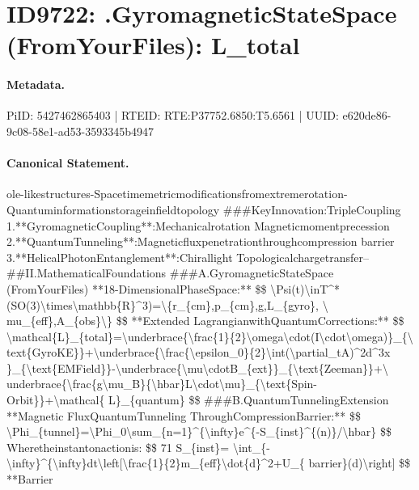\section*{ID9722: .GyromagneticStateSpace (FromYourFiles): L\_total}
\paragraph{Metadata.}
PiID: 5427462865403 | RTEID: RTE:P37752.6850:T5.6561 | UUID: e620de86-9c08-58e1-ad53-3593345b4947

\paragraph{Canonical Statement.}
ole-likestructures-Spacetimemetricmodificationsfromextremerotation-Quantuminformationstorageinfieldtopology \#\#\#KeyInnovation:TripleCoupling 1.**GyromagneticCoupling**:Mechanicalrotation Magneticmomentprecession 2.**QuantumTunneling**:Magneticfluxpenetrationthroughcompression barrier 3.**HelicalPhotonEntanglement**:Chirallight Topologicalchargetransfer-- \#\#II.MathematicalFoundations \#\#\#A.GyromagneticStateSpace (FromYourFiles) **18-DimensionalPhaseSpace:** \$\$ \textbackslash{}Psi(t)\textbackslash{}inT\textasciicircum{}*(SO(3)\textbackslash{}times\textbackslash{}mathbb\{R\}\textasciicircum{}3)=\textbackslash{}\{r\_\{cm\},p\_\{cm\},g,L\_\{gyro\}, \textbackslash{} mu\_\{eff\},A\_\{obs\}\textbackslash{}\} \$\$ **Extended LagrangianwithQuantumCorrections:** \$\$ \textbackslash{}mathcal\{L\}\_\{total\}=\textbackslash{}underbrace\{\textbackslash{}frac\{1\}\{2\}\textbackslash{}omega\textbackslash{}cdot(I\textbackslash{}cdot\textbackslash{}omega)\}\_\{\textbackslash{} text\{GyroKE\}\}+\textbackslash{}underbrace\{\textbackslash{}frac\{\textbackslash{}epsilon\_0\}\{2\}\textbackslash{}int(\textbackslash{}partial\_tA)\textasciicircum{}2d\textasciicircum{}3x \}\_\{\textbackslash{}text\{EMField\}\}-\textbackslash{}underbrace\{\textbackslash{}mu\textbackslash{}cdotB\_\{ext\}\}\_\{\textbackslash{}text\{Zeeman\}\}+\textbackslash{} underbrace\{\textbackslash{}frac\{g\textbackslash{}mu\_B\}\{\textbackslash{}hbar\}L\textbackslash{}cdot\textbackslash{}mu\}\_\{\textbackslash{}text\{Spin-Orbit\}\}+\textbackslash{}mathcal\{ L\}\_\{quantum\} \$\$ \#\#\#B.QuantumTunnelingExtension **Magnetic FluxQuantumTunneling ThroughCompressionBarrier:** \$\$ \textbackslash{}Phi\_\{tunnel\}=\textbackslash{}Phi\_0\textbackslash{}sum\_\{n=1\}\textasciicircum{}\{\textbackslash{}infty\}e\textasciicircum{}\{-S\_\{inst\}\textasciicircum{}\{(n)\}/\textbackslash{}hbar\} \$\$ Wheretheinstantonactionis: \$\$ 71 S\_\{inst\}= \textbackslash{}int\_\{-\textbackslash{}infty\}\textasciicircum{}\{\textbackslash{}infty\}dt\textbackslash{}left[\textbackslash{}frac\{1\}\{2\}m\_\{eff\}\textbackslash{}dot\{d\}\textasciicircum{}2+U\_\{ barrier\}(d)\textbackslash{}right] \$\$ **Barrier

